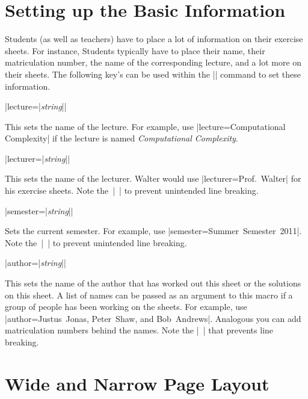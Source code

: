 \documentclass[a4paper,fleqn]{report}
\def\syntaxdefaultarg#1{\hfill\texttt{\small #1}\par\smallskip\noindent\ignorespaces}
\def\metaargument#1{\textit{\small #1}}
\begin{document}
\section{Setting up the Basic Information}

Students (as well as teachers) have to place a lot of information on
their exercise sheets. For instance, Students typically have to place
their name, their matriculation number, the name of the corresponding
lecture, and a lot more on their sheets. The following key's can be
used within the |\sheetconf| command to set these information.

\begin{syntax}
  |lecture={|\metaargument{string}|}| \syntaxdefaultarg{}
  This sets the name of the lecture. For example, use
  |lecture={Computational Complexity}| if the lecture is named
  \emph{Computational Complexity}.
\end{syntax}

\begin{syntax}
  |lecturer={|\metaargument{string}|}| \syntaxdefaultarg{}
  This sets the name of the lecturer. Walter would use
  |lecturer={Prof.~Walter}| for his exercise sheets. Note the~|~|
  to prevent unintended line breaking.
\end{syntax}

\begin{syntax}
  |semester={|\metaargument{string}|}| \syntaxdefaultarg{}
  Sets the current semester. For example, use 
  |semester={Summer~Semester~2011}|. Note the~|~| to prevent
  unintended line breaking.
\end{syntax}

\begin{syntax}
  |author={|\metaargument{string}|}| \syntaxdefaultarg{}
  This sets the name of the author that has worked out this sheet or
  the solutions on this sheet. A list of names can be passed as an
  argument to this macro if a group of people has been working on the
  sheets. For example, use 
  |author={Justus~Jonas, Peter~Shaw, and Bob~Andrews}|. 
  Analogous you can add matriculation numbers behind
  the names. Note the |~| that prevents line breaking.
\end{syntax}


\section{Wide and Narrow Page Layout}
\end{document}
